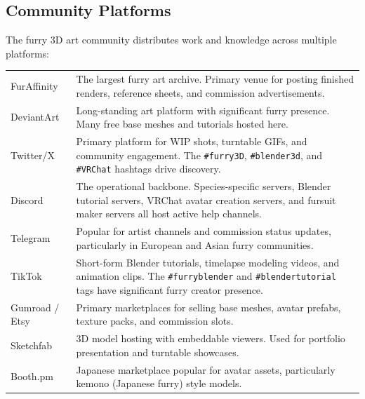 \subsection{Community Platforms}

The furry 3D art community distributes work and knowledge across multiple platforms:

\begin{center}
\begin{tabularx}{\textwidth}{L{3cm}X}
\toprule
{}
 &  \\
\midrule
FurAffinity & The largest furry art archive. Primary venue for posting finished renders, reference sheets, and commission advertisements. \\
DeviantArt & Long-standing art platform with significant furry presence. Many free base meshes and tutorials hosted here. \\
Twitter/X & Primary platform for WIP shots, turntable GIFs, and community engagement. The \texttt{\#furry3D}, \texttt{\#blender3d}, and \texttt{\#VRChat} hashtags drive discovery. \\
Discord & The operational backbone. Species-specific servers, Blender tutorial servers, VRChat avatar creation servers, and fursuit maker servers all host active help channels. \\
Telegram & Popular for artist channels and commission status updates, particularly in European and Asian furry communities. \\
TikTok & Short-form Blender tutorials, timelapse modeling videos, and animation clips. The \texttt{\#furryblender} and \texttt{\#blendertutorial} tags have significant furry creator presence. \\
Gumroad / Etsy & Primary marketplaces for selling base meshes, avatar prefabs, texture packs, and commission slots. \\
Sketchfab & 3D model hosting with embeddable viewers. Used for portfolio presentation and turntable showcases. \\
Booth.pm & Japanese marketplace popular for avatar assets, particularly kemono (Japanese furry) style models. \\
\bottomrule
\end{tabularx}
\end{center}



